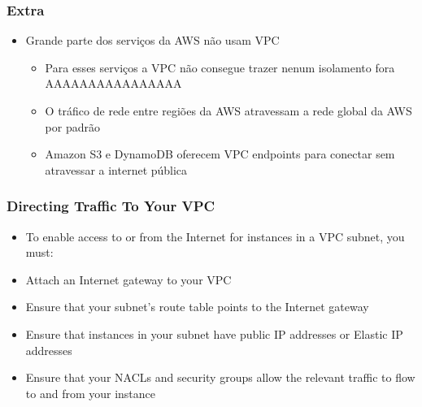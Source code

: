\begin{frame}
	\frametitle{Extra}
	\begin{itemize}
		\item Grande parte dos serviços da AWS não usam VPC
			\begin{itemize}
				\item Para esses serviços a VPC não consegue trazer nenum isolamento fora AAAAAAAAAAAAAAAA
				\item O tráfico de rede entre regiões da AWS atravessam a rede global da AWS por padrão
				\item Amazon S3 e DynamoDB oferecem VPC endpoints para conectar  sem atravessar a internet pública
			\end{itemize}
	\end{itemize}
\end{frame}

\begin{frame}
	\frametitle{Directing Traffic To Your VPC}
	\begin{itemize}
		\item To enable access to or from the Internet for instances in a VPC subnet, you must:
		\item Attach an Internet gateway to your VPC
		\item Ensure that your subnet's route table points to the Internet gateway
		\item Ensure that instances in your subnet have public IP addresses or
Elastic IP addresses
		\item  Ensure that your NACLs and security groups allow the relevant
traffic to flow to and from your instance
	\end{itemize}
\end{frame}
